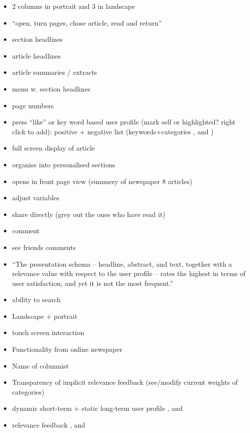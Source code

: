 \begin{itemize}
	\item 2 columns in portrait and 3 in landscape
	\item ``open, turn pages, chose article, read and return'' \cite[p. 6]{FULLTEXT01.pdf}
	\item section headlines \cite[p. 6-7]{kristin-fredrik.pdf}
	\item article headlines
	\item article summaries / extracts \cite{fulltext.pdf}
	\item menu w. section headlines \cite[p. 8]{kristin-fredrik.pdf}
	\item page numbers \cite[p. 6-7]{kristin-fredrik.pdf}
	\item press ``like'' or key word based user profile (mark self or highlighted? right click to add): positive + negative list (keywords+categories \cite{10-1-1-19-5583}, \cite{fulltext.pdf} and \cite{gervasum2001ws.pdf})
	\item full screen display of article
	\item organise into personalised sections
	\item opens in front page view (summery of newspaper 8 articles) \cite[p. 8]{kristin-fredrik.pdf}
	\item adjust variables
	\item share directly (grey out the ones who have read it)
	\item comment
	\item see friends comments
	\item ``The presentation schema -- headline, abstract, and text, together with a relevance value with respect to the user profile -- rates the highest in terms of user satisfaction, and yet it is not the most frequent.'' \cite{Sections-categories-and-keywords-as-interest-specification-tools-for-personalised-news-services.pdf}
	\item  ability to search \cite[p. 7]{FULLTEXT01.pdf}
	\item Landscape + portrait \cite[p. 6-7]{kristin-fredrik.pdf}
	\item touch screen interaction \cite[p. 6-7]{kristin-fredrik.pdf}
	\item Functionality from online newspaper \cite{hcii2005-1004.pdf}
	\item Name of columnist \cite[p. 4]{gervasum2001ws.pdf}
	\item Transparency of implicit relevance feedback (see/modify current weights of categories) \cite[p. 7]{gervasum2001ws.pdf}
	\item dynamic short-term + static long-term user profile \cite{10-1-1-19-5583}, \cite{fulltext.pdf} and \cite{gervasum2001ws.pdf}
	\item relevance feedback \cite{10-1-1-19-5583}, \cite{fulltext.pdf} and \cite{gervasum2001ws.pdf}
\end{itemize}

